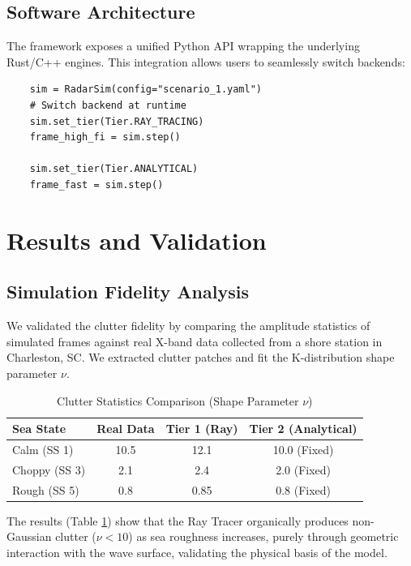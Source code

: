 \documentclass[conf]{new-aiaa}
\begin{document}
\subsection{Software Architecture}
The framework exposes a unified Python API wrapping the underlying Rust/C++ engines. This integration allows users to seamlessly switch backends:
\begin{verbatim}
    sim = RadarSim(config="scenario_1.yaml")
    # Switch backend at runtime
    sim.set_tier(Tier.RAY_TRACING) 
    frame_high_fi = sim.step()
    
    sim.set_tier(Tier.ANALYTICAL)
    frame_fast = sim.step()
\end{verbatim}

\section{Results and Validation}

\subsection{Simulation Fidelity Analysis}
We validated the clutter fidelity by comparing the amplitude statistics of simulated frames against real X-band data collected from a shore station in Charleston, SC. We extracted clutter patches and fit the K-distribution shape parameter $\nu$.
\begin{table}[h]
\centering
\caption{Clutter Statistics Comparison (Shape Parameter $\nu$)}
\label{tab:clutter_stats}
\begin{tabular}{@{}lccc@{}}
\toprule
\textbf{Sea State} & \textbf{Real Data} & \textbf{Tier 1 (Ray)} & \textbf{Tier 2 (Analytical)} \\ \midrule
Calm (SS 1) & 10.5 & 12.1 & 10.0 (Fixed) \\
Choppy (SS 3) & 2.1 & 2.4 & 2.0 (Fixed) \\
Rough (SS 5) & 0.8 & 0.85 & 0.8 (Fixed) \\ \bottomrule
\end{tabular}
\end{table}
The results (Table \ref{tab:clutter_stats}) show that the Ray Tracer organically produces non-Gaussian clutter ($\nu < 10$) as sea roughness increases, purely through geometric interaction with the wave surface, validating the physical basis of the model.
\end{document}
